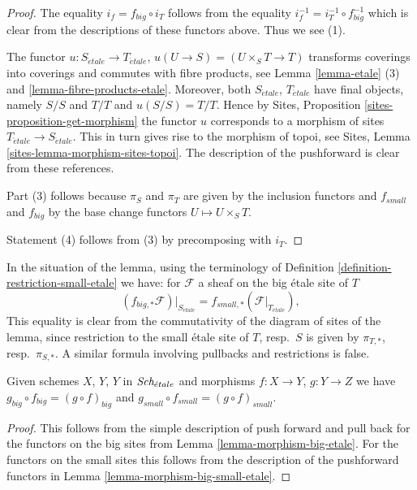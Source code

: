 \begin{proof}
The equality $i_f = f_{big} \circ i_T$ follows from the
equality $i_f^{-1} = i_T^{-1} \circ f_{big}^{-1}$ which is
clear from the descriptions of these functors above.
Thus we see (1).

\medskip\noindent
The functor
$u :
S_{\acute{e}tale}
\to
T_{\acute{e}tale}$, $u(U \to S) = (U \times_S T \to T)$
transforms coverings into coverings and commutes with fibre products,
see Lemma \ref{lemma-etale} (3) and \ref{lemma-fibre-products-etale}.
Moreover, both $S_{\acute{e}tale}$, $T_{\acute{e}tale}$ have final objects,
namely $S/S$ and $T/T$ and $u(S/S) = T/T$. Hence by
Sites, Proposition \ref{sites-proposition-get-morphism}
the functor $u$ corresponds to a morphism of sites
$T_{\acute{e}tale} \to S_{\acute{e}tale}$. This in turn gives rise to the
morphism of topoi, see
Sites, Lemma \ref{sites-lemma-morphism-sites-topoi}. The description
of the pushforward is clear from these references.

\medskip\noindent
Part (3) follows because $\pi_S$ and $\pi_T$ are given by the
inclusion functors and $f_{small}$ and $f_{big}$ by the
base change functors $U \mapsto U \times_S T$.

\medskip\noindent
Statement (4) follows from (3) by precomposing with $i_T$.
\end{proof}

\noindent
In the situation of the lemma, using the terminology of
Definition \ref{definition-restriction-small-etale}
we have: for $\mathcal{F}$ a sheaf on the big \'etale site of $T$
$$
(f_{big, *}\mathcal{F})|_{S_{\acute{e}tale}} =
f_{small, *}(\mathcal{F}|_{T_{\acute{e}tale}}),
$$
This equality is clear from the commutativity of the diagram of
sites of the lemma, since restriction to the small \'etale site of
$T$, resp.\ $S$ is given by $\pi_{T, *}$, resp.\ $\pi_{S, *}$. A similar
formula involving pullbacks and restrictions is false.

\begin{lemma}
\label{lemma-composition-etale}
Given schemes $X$, $Y$, $Y$ in $\textit{Sch}_{\acute{e}tale}$
and morphisms $f : X \to Y$, $g : Y \to Z$ we have
$g_{big} \circ f_{big} = (g \circ f)_{big}$ and
$g_{small} \circ f_{small} = (g \circ f)_{small}$.
\end{lemma}

\begin{proof}
This follows from the simple description of push forward
and pull back for the functors on the big sites from
Lemma \ref{lemma-morphism-big-etale}. For the functors
on the small sites this follows from the description of
the pushforward functors in Lemma \ref{lemma-morphism-big-small-etale}.
\end{proof}

